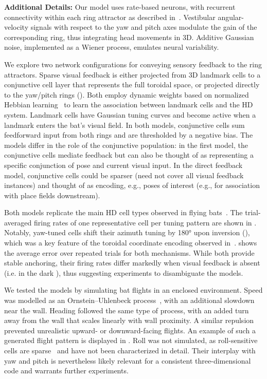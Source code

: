 \documentclass[12pt, letterpaper]{article}
\begin{document}
\textbf{Additional Details:} Our model uses rate-based neurons, with recurrent connectivity within each ring attractor as described in~\cite{Zhang1996}. Vestibular angular-velocity signals with respect to the yaw and pitch axes modulate the gain of the corresponding ring, thus integrating head movements in 3D. Additive Gaussian noise, implemented as a Wiener process, emulates neural variability. 

We explore two network configurations for conveying sensory feedback to the ring attractors. Sparse visual feedback is either projected from 3D landmark cells to a conjunctive cell layer that represents the full toroidal space, or projected directly to the yaw/pitch rings (). Both employ dynamic weights based on normalized Hebbian learning~\cite{Miller1994} to learn the association between landmark cells and the HD system. Landmark cells have Gaussian tuning curves and become active when a landmark enters the bat’s visual field. In both models, conjunctive cells sum feedforward input from both rings and are thresholded by a negative bias. The models differ in the role of the conjunctive population: in the first model, the conjunctive cells mediate feedback but can also be thought of as representing a specific conjunction of pose and current visual input. In the direct feedback model, conjunctive cells could be sparser (need not cover all visual feedback instances) and thought of as encoding, e.g., poses of interest (e.g., for association with place fields downstream).

Both models replicate the main HD cell types observed in flying bats~\cite{Finkelstein2015}. The trial-averaged firing rates of one representative cell per tuning pattern are shown in . Notably, yaw-tuned cells shift their azimuth tuning by \ang{180} upon inversion (), which was a key feature of the toroidal coordinate encoding observed in~\cite{Finkelstein2015}.  shows the average error over repeated trials for both mechanisms. While both provide stable anchoring, their firing rates differ markedly when visual feedback is absent (i.e. in the dark ), thus suggesting experiments to disambiguate the models.

We tested the models by simulating bat flights in an enclosed environment. Speed was modelled as an Ornstein--Uhlenbeck process~\cite{Gillespie1996}, with an additional slowdown near the wall. Heading followed the same type of process, with an added turn away from the wall that scales linearly with wall proximity. A similar repulsion prevented unrealistic upward- or downward-facing flights. An example of such a generated flight pattern is displayed in . Roll was not simulated, as roll-sensitive cells are sparse~\cite{Finkelstein2015} and have not been characterized in detail. Their interplay with yaw and pitch is nevertheless likely relevant for a consistent three-dimensional code and warrants further experiments.
\end{document}

